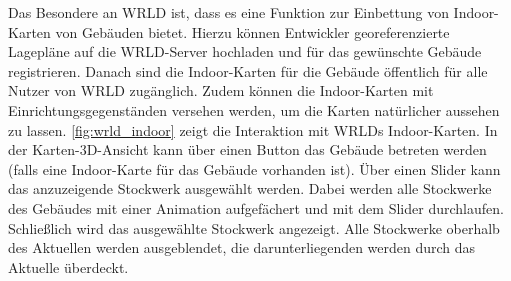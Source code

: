 Das Besondere an WRLD ist, dass es eine Funktion zur Einbettung von Indoor-Karten von Gebäuden bietet.
Hierzu können Entwickler georeferenzierte Lagepläne auf die WRLD-Server hochladen und für das gewünschte Gebäude registrieren.
Danach sind die Indoor-Karten für die Gebäude öffentlich für alle Nutzer von WRLD zugänglich.
Zudem können die Indoor-Karten mit Einrichtungsgegenständen versehen werden, um die Karten natürlicher aussehen zu lassen.
\autoref{fig:wrld_indoor} zeigt die Interaktion mit WRLDs Indoor-Karten.
In der Karten-3D-Ansicht kann über einen Button das Gebäude betreten werden (falls eine Indoor-Karte für das Gebäude vorhanden ist).
Über einen Slider kann das anzuzeigende Stockwerk ausgewählt werden.
Dabei werden alle Stockwerke des Gebäudes mit einer Animation aufgefächert und mit dem Slider durchlaufen.
Schließlich wird das ausgewählte Stockwerk angezeigt.
Alle Stockwerke oberhalb des Aktuellen werden ausgeblendet, die darunterliegenden werden durch das Aktuelle überdeckt.
